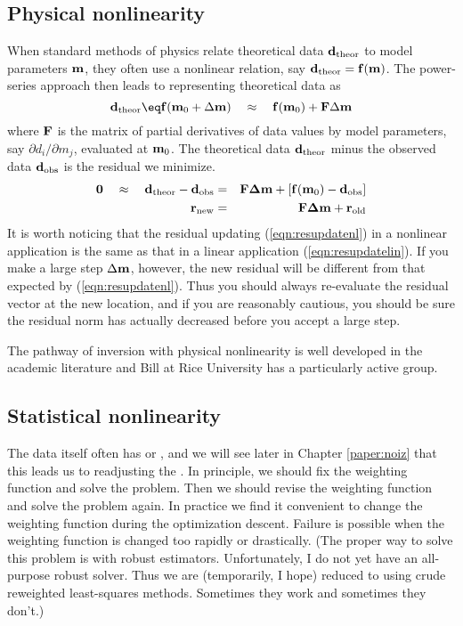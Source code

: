 \subsection{Physical nonlinearity}
When standard methods of physics
relate theoretical data $\bold d_{\rm theor}$ to model parameters $\bold m$,
they often use a nonlinear relation,
say $\bold d_{\rm theor} =\bold f(\bold m)$.
The power-series approach then leads to
representing theoretical data as
\begin{equation}
\bold d_{\rm theor} \eq
  \bold f(\bold m_0 + \Delta \bold m)
  \quad\approx\quad
  \bold f\bold (\bold m_0) + \bold F\Delta \bold m
\end{equation}
where $\bold F$ is the matrix of partial derivatives
of data values by model parameters,
say $\partial d_i/\partial m_j$,
evaluated at $\bold m_0$.
The theoretical data  $\bold d_{\rm theor}$ minus
the observed data $\bold d_{\rm obs}$ is the residual we minimize.
\begin{eqnarray}
\bold 0 \quad\approx\quad
 \bold d_{\rm theor} - \bold d_{\rm obs}
 &=& \bold F\bold \Delta\bold  m +[\bold f(\bold m_0) - \bold d_{\rm obs}] \\
\bold r_{\rm new}
 &=& \bold F\bold \Delta\bold  m + \bold r_{\rm old}
\label{eqn:resupdatenl}
\end{eqnarray}
It is worth noticing that the residual updating
(\ref{eqn:resupdatenl})
in a nonlinear application is the same
as that in a linear application (\ref{eqn:resupdatelin}).
If you make a large step $\Delta \bold m$, however,
the new residual
will be different from that expected by
(\ref{eqn:resupdatenl}).
Thus you should always re-evaluate the residual vector at the new location,
and if you are reasonably cautious,
you should be sure the residual norm has actually decreased
before you accept a large step.

\par
The pathway of inversion with physical nonlinearity
is well developed in the academic literature
and Bill  at Rice University has a particularly active group.

\subsection{Statistical nonlinearity}
The data itself often has  or , and we will
see later in Chapter \ref{paper:noiz} that this leads us to
readjusting the .  In principle, we should fix
the weighting function and solve the problem.  Then we should revise
the weighting function and solve the problem again.  In practice we
find it convenient to change the weighting function during the
optimization descent.  Failure is possible when the weighting function
is changed too rapidly or drastically.  (The proper way to solve this
problem is with robust estimators.  Unfortunately, I do not yet have
an all-purpose robust solver.  Thus we are (temporarily, I hope)
reduced to using crude reweighted least-squares methods.  Sometimes
they work and sometimes they don't.)

